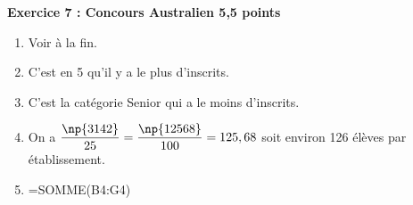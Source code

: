 \textbf{Exercice 7 : Concours Australien \hfill 5,5 points}

\bigskip
 
%
% 
%
 
\begin{enumerate}
\item %
Voir à la fin. 
\item %
C'est en 5 qu'il y a le plus d'inscrits. 
\item %
C'est la catégorie Senior qui a le moins d'inscrits. 
\item %
On a $\dfrac{\np{3142}}{25} = \dfrac{\np{12568}}{100} = 125,68$ soit environ 126 élèves par établissement. 
\item %

=SOMME(B4:G4)
\end{enumerate}

\bigskip 

